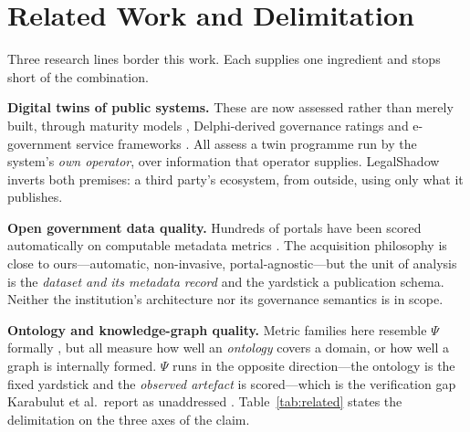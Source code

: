 \documentclass[engproc,proceedingpaper,submit,moreauthors]{Definitions/mdpi}
\begin{document}
\section{Related Work and Delimitation}
\label{sec:related}
    Three research lines border this work. Each supplies one ingredient and stops short of the combination.

    \textbf{Digital twins of public systems.} These are now assessed rather than merely built, through maturity models \cite{Haraguchi2024}, Delphi-derived governance ratings \cite{DiazSarachaga2025} and e-government service frameworks \cite{Anshari2022}. All assess a twin programme run by the system's \emph{own operator}, over information that operator supplies. LegalShadow inverts both premises: a third party's ecosystem, from outside, using only what it publishes.

    \textbf{Open government data quality.} Hundreds of portals have been scored automatically on computable metadata metrics \cite{Neumaier2016,Kubler2018,Vetro2016}. The acquisition philosophy is close to ours---automatic, non-invasive, portal-agnostic---but the unit of analysis is the \emph{dataset and its metadata record} and the yardstick a publication schema. Neither the institution's architecture nor its governance semantics is in scope.

    \textbf{Ontology and knowledge-graph quality.} Metric families here resemble $\Psi$ formally \cite{Zaitoun2023,AbadNavarro2025,Seo2022}, but all measure how well an \emph{ontology} covers a domain, or how well a graph is internally formed. $\Psi$ runs in the opposite direction---the ontology is the fixed yardstick and the \emph{observed artefact} is scored---which is the verification gap Karabulut et al.\ report as unaddressed \cite{Karabulut2024}. Table~\ref{tab:related} states the delimitation on the three axes of the claim.
\end{document}
